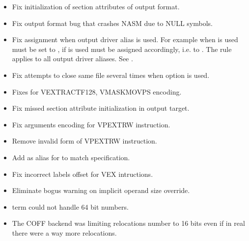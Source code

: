
\begin{itemize}
    \item{Fix initialization of section attributes of  output format.}
    \item{Fix  output format bug that crashes NASM due to NULL symbols.}
\end{itemize}


\begin{itemize}
    \item{Fix  assignment when output driver alias
        is used. For example when  is used 
        must be set to , if  is used 
        must be assigned accordingly, i.e. to . The rule applies to
        all output driver aliases. See .}
\end{itemize}


\begin{itemize}
    \item{Fix attempts to close same file several times when  option is used.}
    \item{Fixes for VEXTRACTF128, VMASKMOVPS encoding.}
\end{itemize}


\begin{itemize}
    \item{Fix missed section attribute initialization in  output target.}
\end{itemize}


\begin{itemize}
    \item{Fix arguments encoding for VPEXTRW instruction.}
    \item{Remove invalid form of VPEXTRW instruction.}
    \item{Add  as alias for  to match specification.}
\end{itemize}


\begin{itemize}
    \item{Fix incorrect labels offset for VEX intructions.}
    \item{Eliminate bogus warning on implicit operand size override.}
    \item{ term could not handle 64 bit numbers.}
    \item{The COFF backend was limiting relocations number to 16 bits even if
        in real there were a way more relocations.}
\end{itemize}

